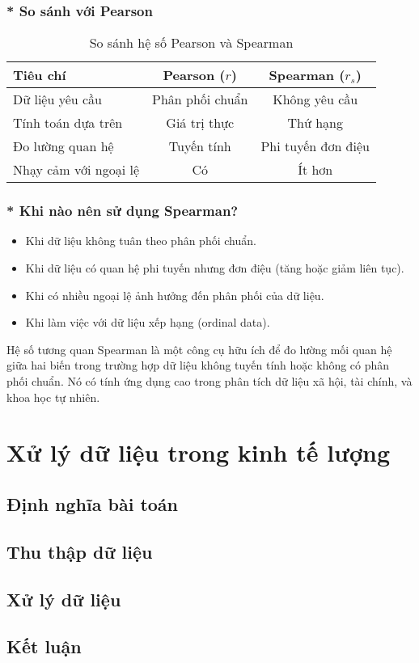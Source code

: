 \subsubsection{* So sánh với Pearson}
\begin{table}[h]
    \centering
    \begin{tabular}{lcc}
        \toprule
        Tiêu chí & Pearson ($r$) & Spearman ($r_s$) \\
        \midrule
        Dữ liệu yêu cầu & Phân phối chuẩn & Không yêu cầu \\
        Tính toán dựa trên & Giá trị thực & Thứ hạng \\
        Đo lường quan hệ & Tuyến tính & Phi tuyến đơn điệu \\
        Nhạy cảm với ngoại lệ & Có & Ít hơn \\
        \bottomrule
    \end{tabular}
    \caption{So sánh hệ số Pearson và Spearman}
    \label{tab:pearson_vs_spearman}
\end{table}

\subsubsection{* Khi nào nên sử dụng Spearman?}
\begin{itemize}
    \item Khi dữ liệu không tuân theo phân phối chuẩn.
    \item Khi dữ liệu có quan hệ phi tuyến nhưng đơn điệu (tăng hoặc giảm liên tục).
    \item Khi có nhiều ngoại lệ ảnh hưởng đến phân phối của dữ liệu.
    \item Khi làm việc với dữ liệu xếp hạng (ordinal data).
\end{itemize}

Hệ số tương quan Spearman là một công cụ hữu ích để đo lường mối quan hệ giữa hai biến trong trường hợp dữ liệu không tuyến tính hoặc không có phân phối chuẩn. Nó có tính ứng dụng cao trong phân tích dữ liệu xã hội, tài chính, và khoa học tự nhiên.


\section{Xử lý dữ liệu trong kinh tế lượng}
\subsection{Định nghĩa bài toán}
\subsection{Thu thập dữ liệu}
\subsection{Xử lý dữ liệu}
\subsection{Kết luận}